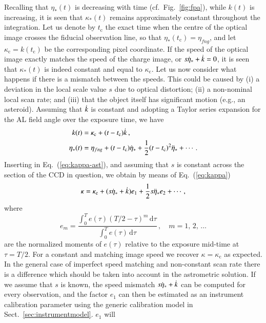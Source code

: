 \documentclass[structabstract]{aa}
\newcommand{\spdot}[1]{\dot{\raisebox{0pt}[7pt][0pt]{${#1}$}}}
\begin{document}
Recalling that $\eta_*(t)$ is decreasing with time (cf.\ Fig.~\ref{fig:fpa}),
while $k(t)$ is increasing, it is seen that $\kappa_*(t)$ remains 
approximately constant throughout the integration. Let us denote by
$t_\text{c}$ the exact time when the centre of the optical image crosses the
fiducial observation line, so that $\eta_*(t_\text{c})=\eta_{fng}$, and let
$\kappa_\text{c}=k(t_\text{c})$ be the corresponding pixel coordinate. If the speed 
of the optical image exactly matches the speed of the charge image, or 
$s\dot{\eta}_*+\spdot{k}=0$, it is seen that $\kappa_*(t)$ is 
indeed constant and equal to $\kappa_\text{c}$. Let us now consider what
happens if there is a mismatch between the speeds. This could be caused
by (i) a deviation in the local scale value $s$ due to optical distortion; 
(ii) a non-nominal local scan rate; and (iii) that the object itself has 
significant motion (e.g., an asteroid). Assuming that $\spdot{k}$ is constant 
and adopting a Taylor series expansion for the AL field angle over the 
exposure time, we have
\begin{align}\label{eq:kappa-model}
k(t) &= \kappa_\text{c} + (t-t_\text{c})\spdot{k} \, , \\
\eta_*(t) &= \eta_{fng} + (t-t_\text{c})\dot{\eta}_* + \frac{1}{2}(t-t_\text{c})^2\ddot{\eta}_* + \cdots\, .
\end{align} 
Inserting in Eq.~(\ref{eq:kappa-ast}), and assuming that $s$ is constant across 
the section of the CCD in question, we obtain by means of Eq.~(\ref{eq:kappa})
\begin{equation}\label{eq:kapp-eff}
\kappa = \kappa_\text{c} + (s\dot{\eta}_*+\spdot{k})e_1 + \frac{1}{2}s\ddot{\eta}_*e_2 + \cdots\, ,
\end{equation}
where
\begin{equation}\label{eq:e-moments}
e_m = \frac{\int_0^T e(\tau)(T/2-\tau)^m\,\text{d}\tau}{\int_0^T e(\tau)\,\text{d}\tau}\, , \quad m = 1,\, 2,\, \dots
\end{equation}
are the normalized moments of $e(\tau)$ relative to
the exposure mid-time at $\tau=T/2$. For a constant and matching image speed
we recover $\kappa=\kappa_\text{c}$ as expected. In the general case of imperfect
speed matching and non-constant scan rate there is a difference which should 
be taken into account in the astrometric solution. If we assume that $s$ is known, 
the speed mismatch $s\dot{\eta}_*+\spdot{k}$ can be computed for every observation, 
and the factor $e_1$ can then be estimated as an instrument calibration parameter 
using the generic calibration model in Sect.~\ref{sec:instrumentmodel}. $e_1$ will
\end{document}
